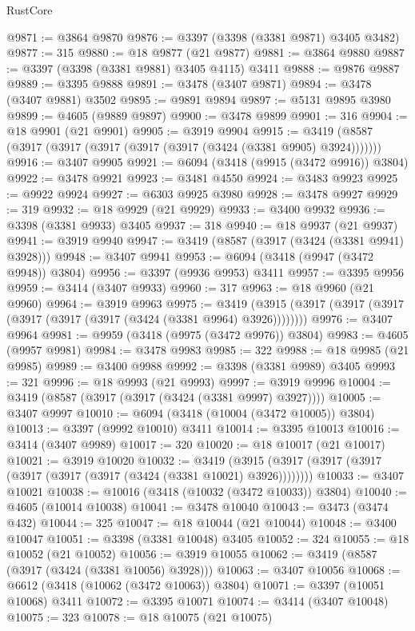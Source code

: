 \begin{lexlean}{RustCore}
\begin{coremodule}
@9871 := @3864 @9870
@9876 := @3397 (@3398 (@3381 @9871) @3405 @3482)
@9877 := 315
@9880 := @18 @9877 (@21 @9877)
@9881 := @3864 @9880
@9887 := @3397 (@3398 (@3381 @9881) @3405 @4115) @3411
@9888 := @9876 @9887
@9889 := @3395 @9888
@9891 := @3478 (@3407 @9871)
@9894 := @3478 (@3407 @9881) @3502
@9895 := @9891 @9894
@9897 := @5131 @9895 @3980
@9899 := @4605 (@9889 @9897)
@9900 := @3478 @9899
@9901 := 316
@9904 := @18 @9901 (@21 @9901)
@9905 := @3919 @9904
@9915 := @3419 (@8587 (@3917 (@3917 (@3917 (@3917 (@3917 (@3424 (@3381 @9905) @3924)))))))
@9916 := @3407 @9905
@9921 := @6094 (@3418 (@9915 (@3472 @9916)) @3804)
@9922 := @3478 @9921
@9923 := @3481 @4550
@9924 := @3483 @9923
@9925 := @9922 @9924
@9927 := @6303 @9925 @3980
@9928 := @3478 @9927
@9929 := 319
@9932 := @18 @9929 (@21 @9929)
@9933 := @3400 @9932
@9936 := @3398 (@3381 @9933) @3405
@9937 := 318
@9940 := @18 @9937 (@21 @9937)
@9941 := @3919 @9940
@9947 := @3419 (@8587 (@3917 (@3424 (@3381 @9941) @3928)))
@9948 := @3407 @9941
@9953 := @6094 (@3418 (@9947 (@3472 @9948)) @3804)
@9956 := @3397 (@9936 @9953) @3411
@9957 := @3395 @9956
@9959 := @3414 (@3407 @9933)
@9960 := 317
@9963 := @18 @9960 (@21 @9960)
@9964 := @3919 @9963
@9975 := @3419 (@3915 (@3917 (@3917 (@3917 (@3917 (@3917 (@3917 (@3424 (@3381 @9964) @3926))))))))
@9976 := @3407 @9964
@9981 := @9959 (@3418 (@9975 (@3472 @9976)) @3804)
@9983 := @4605 (@9957 @9981)
@9984 := @3478 @9983
@9985 := 322
@9988 := @18 @9985 (@21 @9985)
@9989 := @3400 @9988
@9992 := @3398 (@3381 @9989) @3405
@9993 := 321
@9996 := @18 @9993 (@21 @9993)
@9997 := @3919 @9996
@10004 := @3419 (@8587 (@3917 (@3917 (@3424 (@3381 @9997) @3927))))
@10005 := @3407 @9997
@10010 := @6094 (@3418 (@10004 (@3472 @10005)) @3804)
@10013 := @3397 (@9992 @10010) @3411
@10014 := @3395 @10013
@10016 := @3414 (@3407 @9989)
@10017 := 320
@10020 := @18 @10017 (@21 @10017)
@10021 := @3919 @10020
@10032 := @3419 (@3915 (@3917 (@3917 (@3917 (@3917 (@3917 (@3917 (@3424 (@3381 @10021) @3926))))))))
@10033 := @3407 @10021
@10038 := @10016 (@3418 (@10032 (@3472 @10033)) @3804)
@10040 := @4605 (@10014 @10038)
@10041 := @3478 @10040
@10043 := @3473 (@3474 @432)
@10044 := 325
@10047 := @18 @10044 (@21 @10044)
@10048 := @3400 @10047
@10051 := @3398 (@3381 @10048) @3405
@10052 := 324
@10055 := @18 @10052 (@21 @10052)
@10056 := @3919 @10055
@10062 := @3419 (@8587 (@3917 (@3424 (@3381 @10056) @3928)))
@10063 := @3407 @10056
@10068 := @6612 (@3418 (@10062 (@3472 @10063)) @3804)
@10071 := @3397 (@10051 @10068) @3411
@10072 := @3395 @10071
@10074 := @3414 (@3407 @10048)
@10075 := 323
@10078 := @18 @10075 (@21 @10075)

\end{coremodule}
\end{lexlean}
